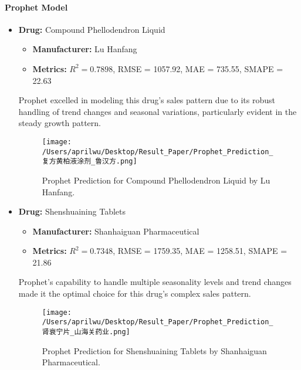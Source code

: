 \documentclass[journal]{IEEEtran}
\begin{document}
\paragraph{Prophet Model}
\begin{itemize}
\item \textbf{Drug:} Compound Phellodendron Liquid
\begin{itemize}
\item \textbf{Manufacturer:} Lu Hanfang
\item \textbf{Metrics:} $R^2 = 0.7898$, RMSE = 1057.92, MAE = 735.55, SMAPE = 22.63
\end{itemize}
Prophet excelled in modeling this drug's sales pattern due to its robust handling of trend changes and seasonal variations, particularly evident in the steady growth pattern.
\begin{figure}[H]
\centering
\texttt{[image: /Users/aprilwu/Desktop/Result\_Paper/Prophet\_Prediction\_复方黄柏液涂剂\_鲁汉方.png]}
\caption{Prophet Prediction for Compound Phellodendron Liquid by Lu Hanfang.}
\label{fig:phellodendron}
\end{figure}
\item \textbf{Drug:} Shenshuaining Tablets
\begin{itemize}
\item \textbf{Manufacturer:} Shanhaiguan Pharmaceutical
\item \textbf{Metrics:} $R^2 = 0.7348$, RMSE = 1759.35, MAE = 1258.51, SMAPE = 21.86
\end{itemize}
Prophet's capability to handle multiple seasonality levels and trend changes made it the optimal choice for this drug's complex sales pattern.
\begin{figure}[H]
\centering
\texttt{[image: /Users/aprilwu/Desktop/Result\_Paper/Prophet\_Prediction\_肾衰宁片\_山海关药业.png]}
\caption{Prophet Prediction for Shenshuaining Tablets by Shanhaiguan Pharmaceutical.}
\label{fig:shenshuaining}
\end{figure}
\end{itemize}
\end{document}
